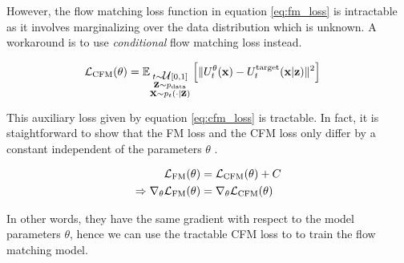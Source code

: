\documentclass[a4paper, 11pt]{article}
\begin{document}
However, the flow matching loss function in equation \eqref{eq:fm_loss} is intractable as it involves marginalizing over the data distribution which is unknown. A workaround is to use \textit{conditional} flow matching loss instead.

\begin{align}
    \mbox{${\cal L}$}_{\text{CFM}}(\theta) &= \mathbb{E}_{\substack{t \sim \mbox{${\cal U}$}[0, 1] \\ 
    \mbox{$\mbox{$\mathbf{z}$}$} \sim p_{\text{data}} \\
    \mbox{$\mbox{$\mathbf{x}$}$} \sim p_t(\cdot | \mbox{$\mbox{$\mathbf{z}$}$})}} \left [ \|U_t^{\theta}(\mbox{$\mbox{$\mathbf{x}$}$}) - U_t^{\text{target}}(\mbox{$\mbox{$\mathbf{x}$}$} | \mbox{$\mbox{$\mathbf{z}$}$}) \|^2 \right ]\label{eq:cfm_loss}
\end{align}

This auxiliary loss given by equation \eqref{eq:cfm_loss} is tractable. In fact, it is staightforward to show that  the FM loss and the CFM loss only differ by a constant independent of the parameters $\theta$ \citep{holderrieth2025generatormatchinggenerativemodeling}.

\begin{align}
    \mbox{${\cal L}$}_{\text{FM}}(\theta) &= \mbox{${\cal L}$}_{\text{CFM}}(\theta) + C \\
    \Rightarrow \nabla_{\theta} \mbox{${\cal L}$}_{\text{FM}}(\theta) &= \nabla_{\theta}\mbox{${\cal L}$}_{\text{CFM}}(\theta)
\end{align}

In other words, they have the same gradient with respect to the model parameters $\theta$, hence we can use the tractable CFM loss to to train the flow matching model.
\end{document}
